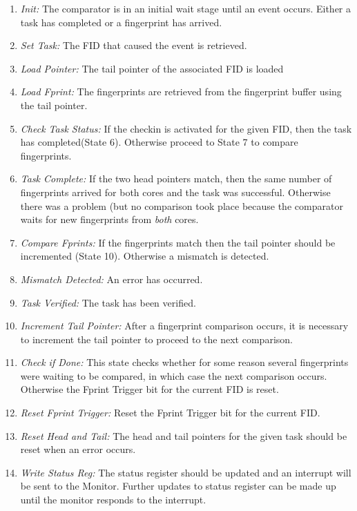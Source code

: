 \begin{enumerate}
\item{\emph{Init:} The comparator is in an initial wait stage until an event occurs. Either a task has completed or a fingerprint has arrived.}
\item{\emph{Set Task:} The FID that caused the event is retrieved.}
\item{\emph{Load Pointer:} The tail pointer of the associated FID is loaded}
\item{\emph{Load Fprint:} The fingerprints are retrieved from the fingerprint buffer using the tail pointer.}
\item{\emph{Check Task Status:} If the checkin is activated for the given FID, then the task has completed(State 6). Otherwise proceed to State 7 to compare fingerprints.}
\item{\emph{Task Complete:} If the two head pointers match, then the same number of fingerprints arrived for both cores and the task was successful. Otherwise there was a problem (but no comparison took place because the comparator waits for new fingerprints from \emph{both} cores.}
\item{\emph{Compare Fprints:} If the fingerprints match then the tail pointer should be incremented (State  10). Otherwise a mismatch is detected.}
\item{\emph{Mismatch Detected:} An error has occurred.}
\item{\emph{Task Verified:} The task has been verified.}
\item{\emph{Increment Tail Pointer:} After a fingerprint comparison occurs, it is necessary to increment the tail pointer to proceed to the next comparison.}
\item{\emph{Check if Done:} This state checks whether for some reason several fingerprints were waiting to be compared, in which case the next comparison occurs. Otherwise the Fprint Trigger bit for the current FID is reset.}
\item{\emph{Reset Fprint Trigger:} Reset the Fprint Trigger bit for the current FID.}
\item{\emph{Reset Head and Tail:} The head and tail pointers for the given task should be reset when an error occurs.}
\item{\emph{Write Status Reg:} The status register should be updated and an interrupt will be sent to the Monitor. Further updates to status register can be made up until the monitor responds to the interrupt.}
\end{enumerate}




